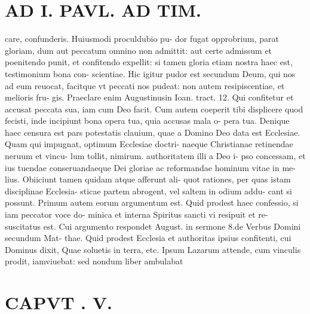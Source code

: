 \documentclass{article}
\begin{document}
\begin{pages}
\section*{AD I. PAVL. AD TIM. }
\marginpar{[ p.326 ]}\pstart care, confunderis. Huiusmodi proculdubio pu- dor fugat opprobrium, parat gloriam, dum aut peccatum omnino non admittit: aut certe admissum et poenitendo punit, et confitendo expellit: si tamen gloria etiam nostra haec est, testimonium bona con- scientiae. Hic igitur pudor est secundum Deum, qui nos ad eum reuocat, facitque vt peccati nos pudeat: non autem resipiscentiae, et melioris fru- gis. Praeclare enim Augustinusin Ioan. tract. 12. Qui confitetur et accusat peccata sua, iam cum Deo facit. Cum autem coeperit tibi displicere quod fecisti, inde incipiunt bona opera tua, quia accusas mala o- pera tua. Denique haec censura est pars potestatis clauium, quae a Domino Deo data est Ecclesiae. Quam qui impugnat, optimum Ecclesiae doctri- naeque Christianae retinendae neruum et vincu- lum tollit, nimirum. authoritatem illi a Deo i- pso concessam, et ius tuendae conseruandaeque Dei gloriae ac reformandae hominum vitae in me- lius. Obiiciunt tamen quidam atque afferunt ali- quot rationes, per quas istam disciplinae Ecclesia- sticae partem abrogent, vel saltem in odium addu- cant si possunt. Primum autem eorum argumentum est. Quid prodest haec confessio, si iam peccator voce do- minica et interna Spiritus sancti vi resipuit et re- suscitatus est. Cui argumento respondet August. in sermone 8.de Verbus  Domini secundum Mat- thae. Quid prodest Ecclesia et authoritas ipsius confitenti, cui Dominus dixit, Quae soluetis in terra, etc. Ipsum Lazarum attende, cum vinculis prodit, iamviuebat: sed nondum liber ambulabat  \pend
\section*{CAPVT . V. }
\marginpar{[ p.27 ]}\pstart {}
{}

\end{pages}
\end{document}
